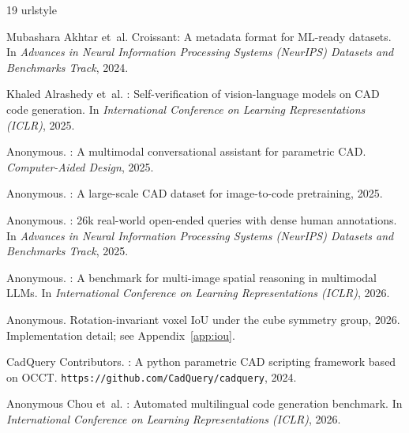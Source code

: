 \documentclass{article}
\begin{document}
\begin{thebibliography}{19}
\providecommand{\natexlab}[1]{#1}
\providecommand{\url}[1]{\texttt{#1}}
\expandafter\ifx\csname urlstyle\endcsname\relax
  \providecommand{\doi}[1]{doi: #1}\else
  \providecommand{\doi}{doi: \begingroup \urlstyle{rm}\Url}\fi

Mubashara Akhtar et~al.
\newblock Croissant: A metadata format for {ML}-ready datasets.
\newblock In \emph{Advances in Neural Information Processing Systems (NeurIPS)
  Datasets and Benchmarks Track}, 2024.

Khaled Alrashedy et~al.
: Self-verification of vision-language models on
  {CAD} code generation.
\newblock In \emph{International Conference on Learning Representations
  (ICLR)}, 2025.

Anonymous.
: A multimodal conversational assistant for parametric
  {CAD}.
\newblock \emph{Computer-Aided Design}, 2025.

{Anonymous}.
: A large-scale {CAD} dataset for image-to-code pretraining,
  2025.

Anonymous.
: 26k real-world open-ended queries with dense human
  annotations.
\newblock In \emph{Advances in Neural Information Processing Systems (NeurIPS)
  Datasets and Benchmarks Track}, 2025.

Anonymous.
: A benchmark for multi-image spatial reasoning in
  multimodal {LLM}s.
\newblock In \emph{International Conference on Learning Representations
  (ICLR)}, 2026.

{Anonymous}.
\newblock Rotation-invariant voxel {IoU} under the cube symmetry group, 2026.
\newblock Implementation detail; see Appendix~\ref{app:iou}.

{CadQuery Contributors}.
: A python parametric {CAD} scripting framework based on
  {OCCT}.
\newblock \url{https://github.com/CadQuery/cadquery}, 2024.

Anonymous Chou et~al.
: Automated multilingual code generation benchmark.
\newblock In \emph{International Conference on Learning Representations
  (ICLR)}, 2026.


\end{thebibliography}
\end{document}
